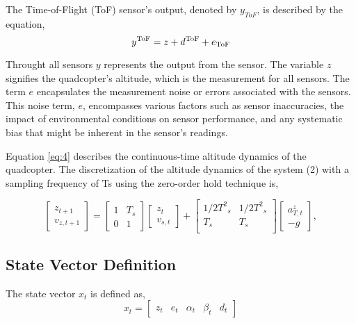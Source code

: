 \documentclass{article}
\begin{document}
The Time-of-Flight (ToF) sensor's output, denoted by \( y_{ToF} \), is described by the equation,
\begin{equation}
y^{\rm ToF} = z + d^{\rm ToF} + e_{\rm ToF}
\end{equation}


Throught all sensors \( y \) represents the output from the sensor. The variable \( z \) signifies the quadcopter's altitude, which is the measurement for all sensors. The term \( e \) encapsulates the measurement noise or errors associated with the sensors. This noise term, \( e \), encompasses various factors such as sensor inaccuracies, the impact of environmental conditions on sensor performance, and any systematic bias that might be inherent in the sensor's readings.

Equation \eqref{eq:4} describes the continuous-time altitude dynamics of the quadcopter. 
The discretization of the altitude dynamics of the system (2) with a sampling frequency of Ts using the zero-order hold technique is,

\begin{equation}
    \begin{bmatrix}
    z_{t+1}\\
    v_{z,t+1}
    \end{bmatrix} =
    \begin{bmatrix}
    1 & T_s \\
    0 & 1 
    \end{bmatrix}
    \begin{bmatrix}
    z_t\\
    v_{s,t}
    \end{bmatrix} + 
    \begin{bmatrix}
    {1/2}{T^2}_s & {1/2}{T^2}_s \\
    T_s & T_s \\ 
    \end{bmatrix}
    \begin{bmatrix}
    a_{T,t}^z \\ 
    -g
    \end{bmatrix},
\end{equation}
\subsection{State Vector Definition}
The state vector \( x_t \) is defined as,
\begin{equation}
    x_t = 
    \begin{bmatrix}
        z_t &
        e_{t} & 
        \alpha_t & 
        \beta_t &
        d_t 
    \end{bmatrix}
\end{equation}
\end{document}
